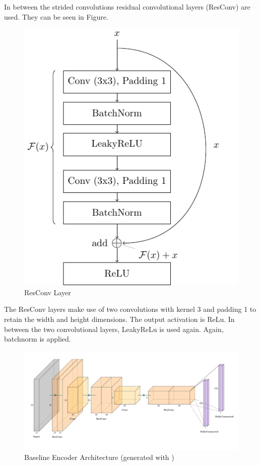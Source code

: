 In between the strided convolutions residual convolutional layers (ResConv) \parencite{ResNet} are used.
They can be seen in Figure.
\begin{figure}[h!]
    \centering
    \includegraphics[]{figures/model_architecture/build/residual_conv_layer.pdf}
    \caption{ResConv Layer \parencite{ResNet}}
\end{figure}
The ResConv layers make use of two convolutions with kernel 3 and padding 1 to retain the width and height dimensions.
The output activation is ReLu.
In between the two convolutional layers, LeakyReLu is used again.
Again, batchnorm is applied.
\begin{figure}[h!]
    \centering
    \includegraphics[width=\textwidth]{figures/model_architecture/build/baseline_vae_encoder.pdf}
    \caption{Baseline Encoder Architecture (generated with \parencite{NNVisualization})}
\end{figure}
